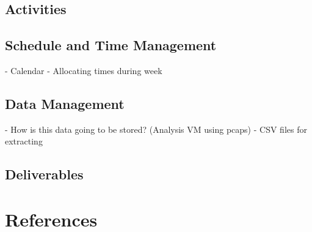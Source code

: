 \documentclass[a4paper,12pt,oneside]{book}			%
\begin{document}
\section{Activities}\label{sec:activities}
\section{Schedule and Time Management}\label{sec:time management}
- Calendar
- Allocating times during week
\section{Data Management}\label{sec:data management}
- How is this data going to be stored? (Analysis VM using pcaps)
- CSV files for extracting
\section{Deliverables}\label{sec: deliverables}



\chapter{References}

\printbibliography
\end{document}
